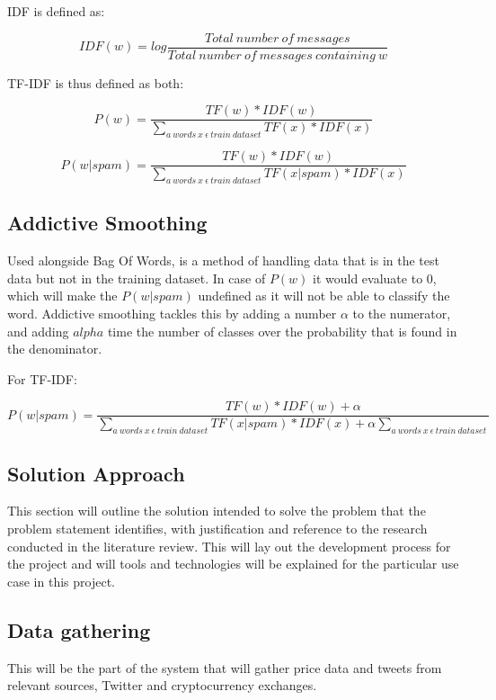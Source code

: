 \documentclass[oneside, 12pt]{article}
\begin{document}
			IDF is defined as:
			
			\[IDF(w) = log\frac{Total\ number\ of\ messages}{Total\ number\ of\ messages\ containing\ w}\]
			
			TF-IDF is thus defined as both:
			
			\[P(w) = \frac{TF(w)*IDF(w)}{\sum _{a\ words\ x\ \epsilon\ train\ dataset} TF(x)*IDF(x)}\]
			
			\[P(w|spam) = \frac{TF(w)*IDF(w)}{\sum _{a\ words\ x\ \epsilon\ train\ dataset} TF(x|spam)*IDF(x)}\]
				
			\cite{34}
			
			\subsection{Addictive Smoothing}
			Used alongside Bag Of Words, is a method of handling data that is in the test data but not in the training dataset. In case of $P(w)$ it would evaluate to 0, which will make the $P(w|spam)$ undefined as it will not be able to classify the word. Addictive smoothing tackles this by adding a number $\alpha$ to the numerator, and adding $alpha$ time the number of classes over the probability that is found in the denominator. \cite{34}
			\newline
			
			For TF-IDF:
			
			\[P(w|spam) = \frac{TF(w)*IDF(w) + \alpha}{\sum _{a\ words\ x\ \epsilon\ train\ dataset} TF(x|spam)*IDF(x) + \alpha\sum_{a\ words\ x\ \epsilon\ train\ dataset}}\]
		
	\newpage
	
	\begin{center}
		\section{Solution Approach}\label{solution}
	\end{center}
		This section will outline the solution intended to solve the problem that the problem statement identifies, with justification and reference to the research conducted in the literature review. This will lay out the development process for the project and will tools and technologies will be explained for the particular use case in this project.
		\newline
		
		\subsection{Data gathering}
		This will be the part of the system that will gather price data and tweets from relevant sources, Twitter and cryptocurrency exchanges.
		\newline
		
\end{document}
